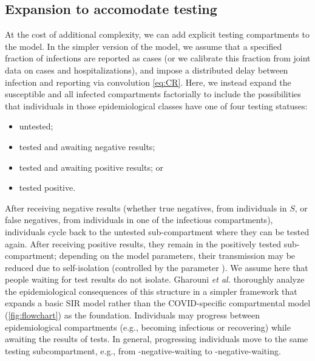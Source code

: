\documentclass[12pt]{article}\usepackage[]{graphicx}\usepackage[]{color}
\begin{document}
\subsection*{Expansion to accomodate testing}

At the cost of additional complexity, we can add explicit testing compartments to the model.  In the simpler version of the model, we assume that a specified fraction of infections are reported as cases (or we calibrate this fraction from joint data on cases and hospitalizations), and impose a distributed delay between infection and reporting via convolution \eqref{eq:CR}.
Here, we instead expand the susceptible and all infected compartments factorially to include the possibilities that individuals in those epidemiological classes have one of four testing statuses:
\begin{itemize}
\item untested;
\item tested and awaiting negative results;
\item tested and awaiting positive results; or 
\item tested positive.
\end{itemize}
After receiving negative results (whether true negatives, from individuals in $S$, or false negatives, from individuals in one of the infectious compartments), individuals cycle back to the untested sub-compartment where they can be tested again. After receiving positive results, they remain in the positively tested sub-compartment; depending on the model parameters, their transmission may be reduced due to self-isolation (controlled by the parameter ).  We assume here that people waiting for test results do not isolate.
Gharouni \emph{et al.}\/ \cite{Ghar+22} thoroughly analyze the epidemiological consequences of this structure in a simpler framework that expands a basic SIR model rather than the COVID-specific compartmental model (\cref{fig:flowchart}) as the foundation.
Individuals may progress between epidemiological compartments (e.g., becoming infectious or recovering) while awaiting the results of tests. In general, progressing individuals move to the same testing subcompartment, e.g., from -negative-waiting to -negative-waiting.
\end{document}

